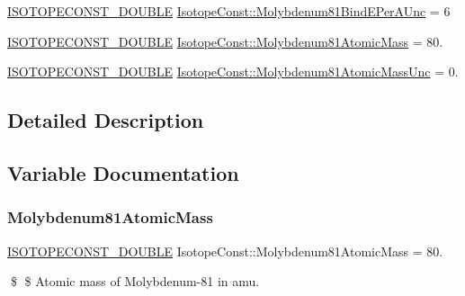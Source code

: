 \begin{DoxyCompactItemize}
\mbox{\hyperlink{group___isotope_const-_macros_ga8f45a7272ce02c0b4c65c44636ed719a}{I\+S\+O\+T\+O\+P\+E\+C\+O\+N\+S\+T\+\_\+\+D\+O\+U\+B\+LE}} \mbox{\hyperlink{group___isotope_const-_molybdenum-_mo81_gacf99b77ab8232d2d9c853a7246e41485}{Isotope\+Const\+::\+Molybdenum81\+Bind\+E\+Per\+A\+Unc}} = 6
\item 
\mbox{\hyperlink{group___isotope_const-_macros_ga8f45a7272ce02c0b4c65c44636ed719a}{I\+S\+O\+T\+O\+P\+E\+C\+O\+N\+S\+T\+\_\+\+D\+O\+U\+B\+LE}} \mbox{\hyperlink{group___isotope_const-_molybdenum-_mo81_gadd0bf1514734ea81e11d569e921fa39b}{Isotope\+Const\+::\+Molybdenum81\+Atomic\+Mass}} = 80.
\item 
\mbox{\hyperlink{group___isotope_const-_macros_ga8f45a7272ce02c0b4c65c44636ed719a}{I\+S\+O\+T\+O\+P\+E\+C\+O\+N\+S\+T\+\_\+\+D\+O\+U\+B\+LE}} \mbox{\hyperlink{group___isotope_const-_molybdenum-_mo81_gaf5f7447bdfa1bd7bfcc190305a7b8c29}{Isotope\+Const\+::\+Molybdenum81\+Atomic\+Mass\+Unc}} = 0.
\end{DoxyCompactItemize}


\subsection{Detailed Description}


\subsection{Variable Documentation}
\mbox{\label{group___isotope_const-_molybdenum-_mo81_gadd0bf1514734ea81e11d569e921fa39b}} 
\subsubsection{\texorpdfstring{Molybdenum81\+Atomic\+Mass}{Molybdenum81AtomicMass}}
{\footnotesize\ttfamily \mbox{\hyperlink{group___isotope_const-_macros_ga8f45a7272ce02c0b4c65c44636ed719a}{I\+S\+O\+T\+O\+P\+E\+C\+O\+N\+S\+T\+\_\+\+D\+O\+U\+B\+LE}} Isotope\+Const\+::\+Molybdenum81\+Atomic\+Mass = 80.}

\$ \$ Atomic mass of Molybdenum-\/81 in amu. \mbox{\label{group___isotope_const-_molybdenum-_mo81_gaf5f7447bdfa1bd7bfcc190305a7b8c29}} 
